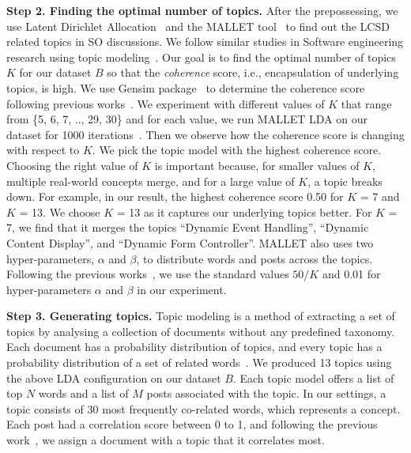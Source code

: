 \nd\textbf{Step 2. Finding the optimal number of topics.}  After the prepossessing, we use Latent Dirichlet Allocation~\cite{blei2003latent} and the MALLET tool~\cite{mccallum2002mallet} to find out the  LCSD related topics in SO discussions. We follow similar studies in Software engineering research using topic modeling~\cite{arun2010finding, asuncion2010software, yang2016security, bagherzadeh2019going,abdellatif2020challenges}. Our goal is to find the optimal number of topics $K$ for our dataset $B$ so that the \textit{coherence} score, i.e., encapsulation of underlying topics, is high. We use Gensim package~\cite{rehurek2010software} to determine the coherence score following previous works~\cite{uddin2017automatic, roder2015exploring}. We experiment with different values of $K$ that range from \{5, 6, 7, .., 29, 30\} and for each value, we run  MALLET LDA on our dataset for 1000 iterations~\cite{bagherzadeh2019going}. Then we observe how the coherence score is changing with respect to $K$. We pick the topic model with the highest coherence score. Choosing the right value of $K$ is important because, for smaller values of $K$, multiple real-world concepts merge, and for a large value of $K$, a topic breaks down. For example, in our result, the highest coherence score 0.50  for $K$ = 7 and $K$ = 13. We choose $K$ = 13 as it captures our underlying topics better. For $K$ = 7, we find that it merges the topics ``Dynamic Event Handling'', ``Dynamic Content Display'', and ``Dynamic Form Controller''. MALLET also uses two hyper-parameters, $\alpha$ and $\beta$, to distribute words and posts across the topics. Following the previous works~\cite{bagherzadeh2019going, ahmed2018concurrency, bajaj2014mining, rosen2016mobile}, we use the standard values $50/K$ and 0.01 for hyper-parameters $\alpha$ and $\beta$ in our experiment.  

\nd\textbf{Step 3. Generating topics.} Topic modeling is a method of extracting a set of topics by analysing a collection of documents without any predefined taxonomy. Each document has a probability distribution of topics, and every topic has a probability distribution of a set of related words~\cite{barua2014developers}. We produced 13 topics using the above LDA configuration on our dataset $B$. Each topic model offers a list of top $N$ words and a list of $M$ posts associated with the topic. In our settings, a topic consists of 30 most frequently co-related words, which represents a concept. Each post had a correlation score between 0 to 1, and following the previous work~\cite{wan2019discussed}, we assign a document with a topic that it correlates most. 







